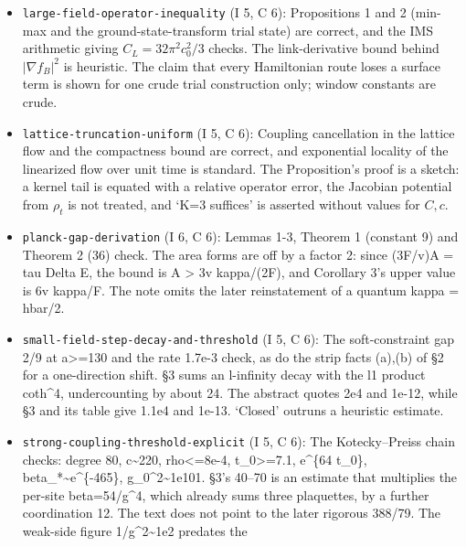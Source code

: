 \documentclass[11pt,a4paper]{article}
\begin{document}
\begin{itemize}
  that the problem `reduces to' two numbers is weakened only in §4b. The
  lead says gauge invariance is no obstruction, while §5 admits Elitzur
  empties the single-link form; the tension is left unresolved. Box
  sizes are corrected in a later note, flagged here. Literature is at
  metadata level.
\item
  \texttt{large-field-operator-inequality} (I 5, C 6): Propositions 1
  and 2 (min-max and the ground-state-transform trial state) are
  correct, and the IMS arithmetic giving \(C_L=32\pi^2c_0^2/3\) checks.
  The link-derivative bound behind \(|\nabla f_B|^2\) is heuristic. The
  claim that every Hamiltonian route loses a surface term is shown for
  one crude trial construction only; window constants are crude.
\item
  \texttt{lattice-truncation-uniform} (I 5, C 6): Coupling cancellation
  in the lattice flow and the compactness bound are correct, and
  exponential locality of the linearized flow over unit time is
  standard. The Proposition's proof is a sketch: a kernel tail is
  equated with a relative operator error, the Jacobian potential from
  \(\rho_t\) is not treated, and `K=3 suffices' is asserted without
  values for \(C,c\).
\item
  \texttt{planck-gap-derivation} (I 6, C 6): Lemmas 1-3, Theorem 1
  (constant 9) and Theorem 2 (36) check. The area forms are off by a
  factor 2: since (3F/v)A = tau Delta E, the bound is A \textgreater{}
  3v kappa/(2F), and Corollary 3's upper value is 6v kappa/F. The note
  omits the later reinstatement of a quantum kappa = hbar/2.
\item
  \texttt{small-field-step-decay-and-threshold} (I 5, C 6): The
  soft-constraint gap 2/9 at a\textgreater=130 and the rate 1.7e-3
  check, as do the strip facts (a),(b) of §2 for a one-direction shift.
  §3 sums an l-infinity decay with the l1 product coth\^{}4,
  undercounting by about 24. The abstract quotes 2e4 and 1e-12, while §3
  and its table give 1.1e4 and 1e-13. `Closed' outruns a heuristic
  estimate.
\item
  \texttt{strong-coupling-threshold-explicit} (I 5, C 6): The
  Kotecky--Preiss chain checks: degree 80, c\textasciitilde220,
  rho\textless=8e-4, t\_0\textgreater=7.1, e\^{}\{64 t\_0\},
  beta\_*\textasciitilde e\^{}\{-465\}, g\_0\^{}2\textasciitilde1e101.
  §3's 40--70 is an estimate that multiplies the per-site
  beta=54/g\^{}4, which already sums three plaquettes, by a further
  coordination 12. The text does not point to the later rigorous 388/79.
  The weak-side figure 1/g\^{}2\textasciitilde1e2 predates the

\end{itemize}
\end{document}
